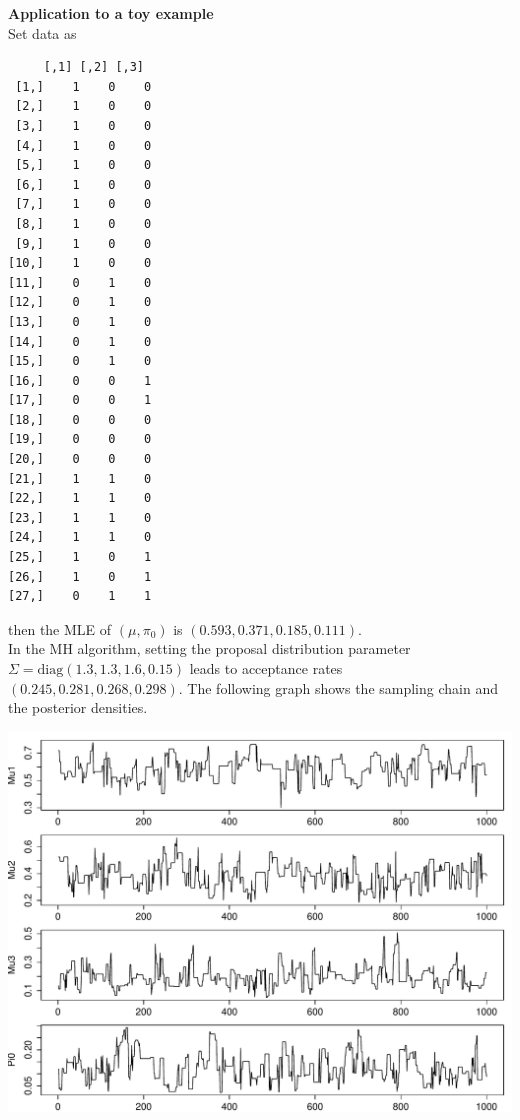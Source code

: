 \documentclass[11 pt, a4paper]{article}  %
\begin{document}
{\bf Application to a toy example}\\
Set data as 
\begin{verbatim}
     [,1] [,2] [,3]
 [1,]    1    0    0
 [2,]    1    0    0
 [3,]    1    0    0
 [4,]    1    0    0
 [5,]    1    0    0
 [6,]    1    0    0
 [7,]    1    0    0
 [8,]    1    0    0
 [9,]    1    0    0
[10,]    1    0    0
[11,]    0    1    0
[12,]    0    1    0
[13,]    0    1    0
[14,]    0    1    0
[15,]    0    1    0
[16,]    0    0    1
[17,]    0    0    1
[18,]    0    0    0
[19,]    0    0    0
[20,]    0    0    0
[21,]    1    1    0
[22,]    1    1    0
[23,]    1    1    0
[24,]    1    1    0
[25,]    1    0    1
[26,]    1    0    1
[27,]    0    1    1
\end{verbatim}
then the MLE of $(\mu, \pi_0)$ is $(0.593, 0.371, 0.185, 0.111)$.\\

In the MH algorithm, setting the proposal distribution parameter $\Sigma = \text{diag}(1.3,1.3,1.6,0.15)$ leads to acceptance rates 
$(0.245, 0.281, 0.268, 0.298)$. The following graph shows the sampling chain and the posterior densities.
\begin{center}
\includegraphics[scale=0.65]{Chains.pdf}
\end{center}
\end{document}
